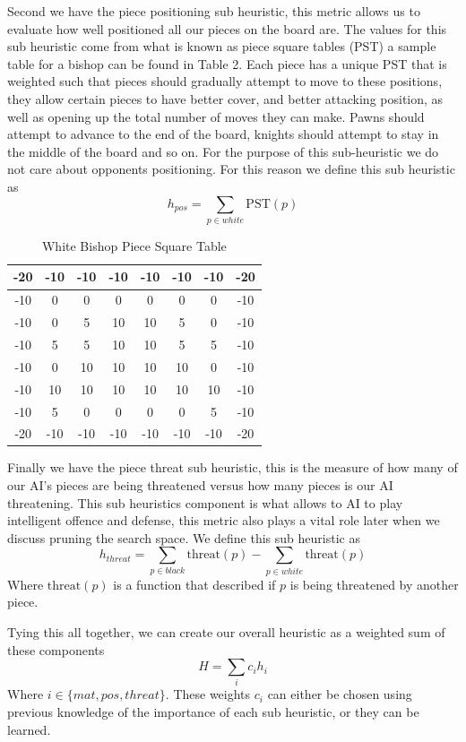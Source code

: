 \documentclass[letterpaper]{article}
\begin{document}
Second we have the piece positioning sub heuristic, this metric allows us to evaluate how well positioned all our pieces on the board are. The values for this sub heuristic come from what is known as piece square tables (PST) a sample table for a bishop can be found in Table 2. Each piece has a unique PST that is weighted such that pieces should gradually attempt to move to these positions, they allow certain pieces to have better cover, and better attacking position, as well as opening up the total number of moves they can make. Pawns should attempt to advance to the end of the board, knights should attempt to stay in the middle of the board and so on. For the purpose of this sub-heuristic we do not care about opponents positioning. For this reason we define this sub heuristic as 
$$
h_{pos} = \sum_{p \in white}\text{PST}(p)
$$
\begin{table}[]
    \centering
    \begin{tabular}{|c|c|c|c|c|c|c|c|} \hline
        -20&-10&-10&-10&-10&-10&-10&-20\\\hline
        -10&  0&  0&  0&  0&  0&  0&-10\\\hline
        -10&  0&  5& 10& 10&  5&  0&-10\\\hline
        -10&  5&  5& 10& 10&  5&  5&-10\\\hline
        -10&  0& 10& 10& 10& 10&  0&-10\\\hline
        -10& 10& 10& 10& 10& 10& 10&-10\\\hline
        -10&  5&  0&  0&  0&  0&  5&-10\\\hline
        -20&-10&-10&-10&-10&-10&-10&-20\\\hline
    \end{tabular}
    \caption{White Bishop Piece Square Table}
    \label{tab:my_label}
\end{table}
Finally we have the piece threat sub heuristic, this is the measure of how many of our AI's pieces are being threatened versus how many pieces is our AI threatening. This sub heuristics component is what allows to AI to play intelligent offence and defense, this metric also plays a vital role later when we discuss pruning the search space. We define this sub heuristic as
$$
h_{threat} = \sum_{p \in black}\text{threat}(p) - \sum_{p \in white}\text{threat}(p)
$$
Where $\text{threat}(p)$ is a function that described if $p$ is being threatened by another piece.

Tying this all together, we can create our overall heuristic as a weighted sum of these components 
$$
H = \sum_{i} c_ih_i
$$
Where $i \in \{mat,pos,threat\}$. These weights $c_i$ can either be chosen using previous knowledge of the importance of each sub heuristic, or they can be learned.
\end{document}
